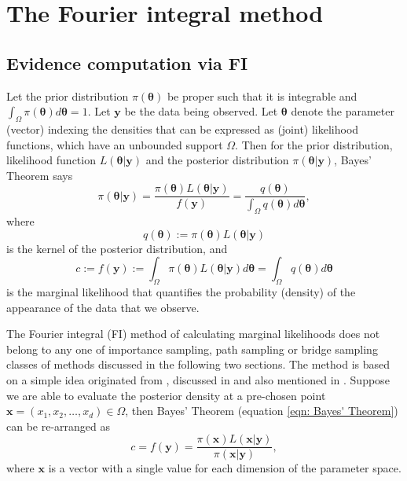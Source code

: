 \documentclass[%
 reprint,
 amsmath,amssymb,
 aps,
]{revtex4-2}
\def\btheta{\boldsymbol{\theta}}
\def\ybold{\mathbf{y}}
\def\xbold{\mathbf{x}}
\begin{document}

\section{\label{sec:FI derivation} The Fourier integral method}
%
\subsection{\label{subsec:FI density estimation} Evidence computation via FI}

Let the prior distribution $\pi(\btheta)$ be proper such that it is integrable and $\displaystyle \int_\Omega \pi(\btheta) d\btheta = 1$. Let $\ybold$ be the data being observed. Let $\btheta$ denote the parameter (vector) indexing the densities that can be expressed as (joint) likelihood functions, which have an unbounded support $\Omega$. Then for the prior distribution, likelihood function $L(\btheta|\ybold)$ and the posterior distribution $\pi(\btheta|\ybold)$, Bayes' Theorem says
\begin{equation} \label{eqn: Bayes' Theorem}
    \pi(\btheta|\ybold) = \frac{\pi(\btheta)L(\btheta|\ybold)}{f(\ybold)} = 
    \frac{q(\btheta)}{\int_\Omega q(\btheta) d\btheta},
\end{equation}
where 
\begin{equation} \label{eqn: posterior kernel q}
    q(\btheta) := \pi(\btheta)L(\btheta|\ybold)
\end{equation}
is the kernel of the posterior distribution, and
\begin{equation} \label{eqn: marginal likelihood}
    c := f(\ybold) := \int_\Omega \pi(\btheta)L(\btheta|\ybold) d\btheta = \int_\Omega q(\btheta) d\btheta
\end{equation}
is the marginal likelihood that quantifies the probability (density) of the appearance of the data that we observe.

The Fourier integral (FI) method of calculating marginal likelihoods does not belong to any one of importance sampling, path sampling or bridge sampling classes of methods discussed in the following two sections. The method is based on a simple idea originated from \cite{chib1995marginal}, discussed in \cite{chib2001marginal} and also mentioned in \cite{raftery1995hypothesis}. Suppose we are able to evaluate the posterior density at a pre-chosen point $\mathbf{x} = (x_1, x_2, \ldots, x_d) \in \Omega$, then Bayes' Theorem (equation \eqref{eqn: Bayes' Theorem}) can be re-arranged as
\begin{equation} \label{eqn: re-arranged Bayes' Theorem for FI method}
    c = f(\ybold) = \frac{\pi(\xbold)L(\xbold | \ybold)}{\pi(\xbold | \ybold)},
\end{equation}
where $\xbold$ is a vector with a single value for each dimension of the parameter space. 
\end{document}
